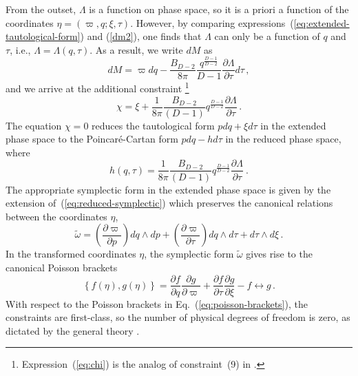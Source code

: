 \documentclass[prd,onecolumn,notitlepage,amsmath,nofootinbib,superscriptaddress,showpacs,showkeys]{revtex4-1}
\begin{document}
From the outset, $\Lambda$ is a function on phase space, so it is
a priori a function of the coordinates $\eta=\left(\varpi,q;\xi,\tau\right)$.
However, by comparing expressions~(\ref{eq:extended-tautological-form})
and (\ref{dm2}), one finds that $\Lambda$ can only be a function
of $q$ and $\tau$, i.e., $\Lambda=\Lambda\left(q,\tau\right)$.
As a result, we write $dM$ as 
\begin{equation}
dM=\varpi dq-\frac{B_{D-2}}{8\pi}\frac{q^{\frac{D-1}{D-2}}}{D-1}\frac{\partial\Lambda}{\partial\tau}d\tau\,,\label{eq:dm3}
\end{equation}
and we arrive at the additional constraint%
\footnote{Expression~(\ref{eq:chi}) is the analog of constraint~(9) in \cite{baldfresmol2016}.%
} 
\begin{equation}
\chi=\xi+\frac{1}{8\pi}\frac{B_{D-2}}{\left(D-1\right)}q^{\frac{D-1}{D-2}}\frac{\partial\Lambda}{\partial\tau}\,.\label{eq:chi}
\end{equation}
The equation $\chi=0$ reduces the tautological form $pdq+\xi d\tau$
in the extended phase space to the Poincar\'e-Cartan form $pdq-hd\tau$
in the reduced phase space, where 
\begin{equation}
h\left(q,\tau\right)=\frac{1}{8\pi}\frac{B_{D-2}}{\left(D-1\right)}q^{\frac{D-1}{D-2}}\frac{\partial\Lambda}{\partial\tau}~.\label{h2}
\end{equation}
The appropriate symplectic form in the extended phase space is given
by the extension of~(\ref{eq:reduced-symplectic}) which preserves
the canonical relations between the coordinates $\eta$, 
\begin{equation}
\tilde{\omega}=\left(\frac{\partial\varpi}{\partial p}\right)dq\wedge dp+\left(\frac{\partial\varpi}{\partial\tau}\right)dq\wedge d\tau+d\tau\wedge d\xi\,.
\end{equation}
In the transformed coordinates $\eta$, the symplectic form $\tilde{\omega}$
gives rise to the canonical Poisson brackets 
\begin{equation}
\left\{ f\left(\eta\right),g\left(\eta\right)\right\} =\frac{\partial f}{\partial q}\frac{\partial g}{\partial\varpi}+\frac{\partial f}{\partial\tau}\frac{\partial g}{\partial\xi}-f\leftrightarrow g\,.\label{eq:poisson-brackets}
\end{equation}
With respect to the Poisson brackets in Eq.~(\ref{eq:poisson-brackets}),
the constraints are first-class, so the number of physical degrees
of freedom is zero, as dictated by the general theory \cite{baldfresmol2016}.
\end{document}
